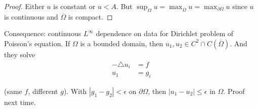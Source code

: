 \documentclass{article}
\newtheorem{one minute paper}[theorem]{One Minute Paper}
\begin{document}
\begin{proof}
    Either $u$ is constant or $u < A$. But $\sup_{\Omega}u = \max_{\overline{\Omega}}u = \max_{\partial \Omega}u$ since $u$ is continuous and $\overline{\Omega}$ is compact.  
\end{proof}

Consequence: continuous $L^{\infty}$ dependence on data for Dirichlet problem of Poisson's equation. If $\Omega$ is a bounded domain, then $u_1, u_2 \in C^{2} \cap C(\overline{\Omega})$. And they solve 
\begin{align*}
    -\triangle u_i &= f \\
    u_1 &= g_i
\end{align*} 

(same $f$, different $g$). With $|g_1 - g_2| < \epsilon$ on $\partial \Omega$, then $|u_1 - u_2| \leq \epsilon$ in $\Omega$.
Proof next time. 
\end{document}
